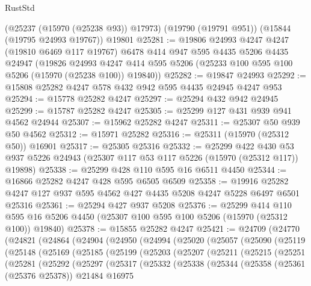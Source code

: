 \begin{lexlean}{RustStd}
\begin{coremodule}
    (@25237 (@15970 (@25238 @93)) @17973)
    (@19790 (@19791 @951))
    (@15844 (@19795 @24993 @19767))
    @19801
@25281 := @19806
    @24993
    @4247
    @4247
    (@19810 @6469 @117 @19767)
    @6478
    @414
    @947
    @595
    @4435
    @5206
    @4435
    @24947
    (@19826
      @24993
      @4247
      @414
      @595
      @5206
      (@25233 @100 @595 @100 @5206 (@15970 (@25238 @100)) @19840))
@25282 := @19847 @24993
@25292 := @15808 @25282 @4247 @578 @432 @942 @595 @4435 @24945 @4247 @953
@25294 := @15778 @25282 @4247
@25297 := @25294 @432 @942 @24945
@25299 := @15787 @25282 @4247
@25305 := @25299 @127 @431 @939 @941 @4562 @24944
@25307 := @15962 @25282 @4247
@25311 := @25307 @50 @939 @50 @4562
@25312 := @15971 @25282
@25316 := @25311 (@15970 (@25312 @50)) @16901
@25317 := @25305 @25316
@25332 := @25299
    @422
    @430
    @53
    @937
    @5226
    @24943
    (@25307 @117 @53 @117 @5226 (@15970 (@25312 @117)) @19898)
@25338 := @25299 @428 @110 @595 @16 @6511 @4450
@25344 := @16866 @25282 @4247 @428 @595 @6505 @6509
@25358 := @19916 @25282 @4247 @127 @937 @595 @4562 @427 @4435 @5208 @4247 @5228 @6497 @6501 @25316
@25361 := @25294 @427 @937 @5208
@25376 := @25299
    @414
    @110
    @595
    @16
    @5206
    @4450
    (@25307 @100 @595 @100 @5206 (@15970 (@25312 @100)) @19840)
@25378 := @15855 @25282 @4247
@25421 := @24709
    (@24770
      (@24821
        (@24864
          (@24904
            (@24950
              (@24994
                (@25020
                  (@25057
                    (@25090
                      (@25119
                        (@25148
                          (@25169
                            (@25185
                              (@25199
                                (@25203
                                  (@25207
                                    (@25211
                                      (@25215
                                        (@25251
                                          (@25281
                                            (@25292
                                              (@25297
                                                (@25317
                                                  (@25332
                                                    (@25338
                                                      (@25344
                                                        (@25358
                                                          (@25361 (@25376 @25378))
                                                          @21484
                                                          @16975

\end{coremodule}
\end{lexlean}
